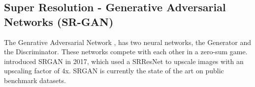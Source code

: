 \documentclass[12pt, letterpaper]{article}
\begin{document}
			\subsection{Super Resolution - Generative Adversarial Networks (SR-GAN)}

			\hspace*{0.25 in} The Genrative Adversarial Network \citep{goodfellow2014generative}, has two neural networks, the Generator and the Discriminator. These networks compete with each other in a zero-sum game.
      \citep{ledig2017photorealistic} introduced SRGAN in 2017, which used a SRResNet to upscale images with an upscaling factor of 4x. SRGAN is currently the state of the art on public benchmark datasets.


\renewcommand\bibname{References}


\end{document}
